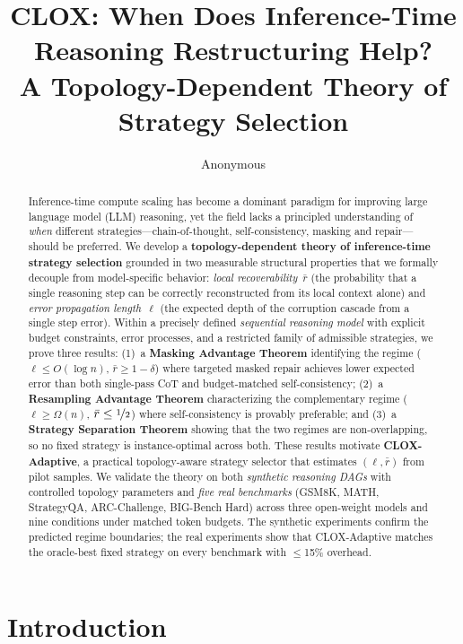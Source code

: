 \documentclass{article}
\title{CLOX: When Does Inference-Time Reasoning Restructuring Help?\\A Topology-Dependent Theory of Strategy Selection}
\author{Anonymous}
\begin{document}
\maketitle

\begin{abstract}
Inference-time compute scaling has become a dominant paradigm for improving large language model (LLM) reasoning, yet the field lacks a principled understanding of \emph{when} different strategies---chain-of-thought, self-consistency, masking and repair---should be preferred. We develop a \textbf{topology-dependent theory of inference-time strategy selection} grounded in two measurable structural properties that we formally decouple from model-specific behavior: \emph{local recoverability}~$\bar{r}$ (the probability that a single reasoning step can be correctly reconstructed from its local context alone) and \emph{error propagation length}~$\ell$ (the expected depth of the corruption cascade from a single step error). Within a precisely defined \emph{sequential reasoning model} with explicit budget constraints, error processes, and a restricted family of admissible strategies, we prove three results: (1)~a \textbf{Masking Advantage Theorem} identifying the regime ($\ell \leq O(\log n)$, $\bar{r} \geq 1 - \delta$) where targeted masked repair achieves lower expected error than both single-pass CoT and budget-matched self-consistency; (2)~a \textbf{Resampling Advantage Theorem} characterizing the complementary regime ($\ell \geq \Omega(n)$, $\bar{r} \leq \nicefrac{1}{2}$) where self-consistency is provably preferable; and (3)~a \textbf{Strategy Separation Theorem} showing that the two regimes are non-overlapping, so no fixed strategy is instance-optimal across both. These results motivate \textbf{CLOX-Adaptive}, a practical topology-aware strategy selector that estimates $(\ell, \bar{r})$ from pilot samples. We validate the theory on both \emph{synthetic reasoning DAGs} with controlled topology parameters and \emph{five real benchmarks} (GSM8K, MATH, StrategyQA, ARC-Challenge, BIG-Bench Hard) across three open-weight models and nine conditions under matched token budgets. The synthetic experiments confirm the predicted regime boundaries; the real experiments show that CLOX-Adaptive matches the oracle-best fixed strategy on every benchmark with $\leq$15\% overhead.
\end{abstract}

\section{Introduction}
\label{sec:introduction}
\end{document}
